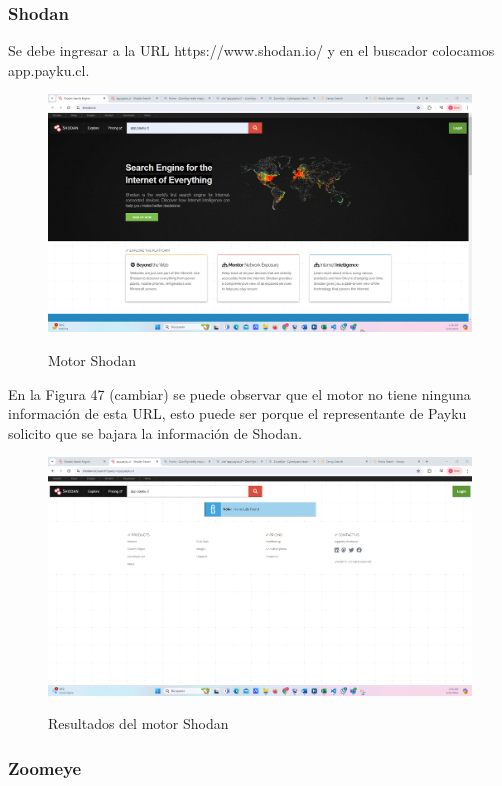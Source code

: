 \documentclass[stu, 11pt, letterpaper, donotrepeattitle, floatsintext, natbib]{apa7}
\begin{document}
\subsubsection{Shodan}

Se debe ingresar a la URL https://www.shodan.io/ y en el buscador colocamos app.payku.cl.

\begin{figure}[H]
    \centering
    \caption{Motor Shodan}
    \includegraphics[width=0.75\linewidth]{ac61.png} %
    \label{fig:OverallEffect}
\end{figure}

En la Figura 47 (cambiar) se puede observar que el motor no tiene ninguna información de esta URL, esto puede ser porque el representante de Payku solicito que se bajara la información de Shodan.

\begin{figure}[H]
    \centering
    \caption{Resultados del motor Shodan}
    \includegraphics[width=0.75\linewidth]{ac62.png} %
    \label{fig:OverallEffect}
\end{figure}

\subsubsection{Zoomeye}
\end{document}
